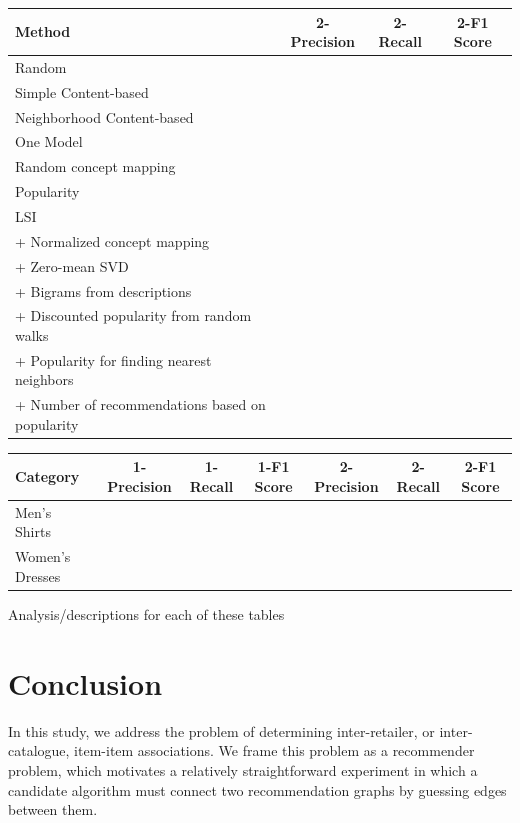 \documentclass[11pt]{article}
\begin{document}
\begin{center}
\begin{tabular}{ | l | c | c | c |}
\hline
Method & 2-Precision & 2-Recall & 2-F1 Score \\ \hline\hline
Random &&&\\ \hline
Simple Content-based &&&\\ \hline
Neighborhood Content-based &&&\\ \hline
One Model &&&\\ \hline
Random concept mapping &&&\\ \hline
Popularity &&&\\ \hline
LSI &&&\\ \hline
\hspace*{0.5cm} + Normalized concept mapping &&&\\ \hline
\hspace*{0.5cm} + Zero-mean SVD &&&\\ \hline
\hspace*{0.5cm} + Bigrams from descriptions &&&\\ \hline
\hspace*{0.5cm} + Discounted popularity from random walks &&&\\ \hline
\hspace*{0.5cm} + Popularity for finding nearest neighbors &&&\\ \hline
\hspace*{0.5cm} + Number of recommendations based on popularity &&&\\ \hline

\end{tabular}
\end{center}

\begin{center}
\begin{tabular}{ | l | c | c | c | c | c | c |}
\hline
Category & 1-Precision & 1-Recall & 1-F1 Score & 2-Precision & 2-Recall & 2-F1 Score \\ \hline\hline
Men's Shirts &&&&&&\\ \hline
Women's Dresses &&&&&&\\ \hline
\end{tabular}
\end{center}

Analysis/descriptions for each of these tables

\section*{Conclusion}
In this study, we address the problem of determining inter-retailer, or
inter-catalogue, item-item associations. We frame this problem as a recommender
problem, which motivates a relatively straightforward experiment in which a
candidate algorithm must connect two recommendation graphs by guessing edges
between them.
\end{document}
